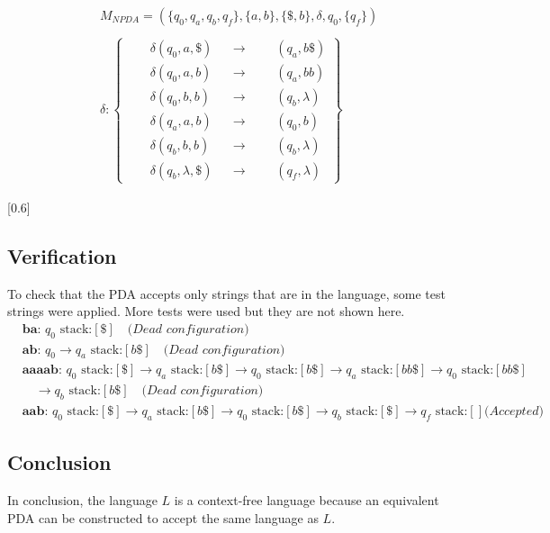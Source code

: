\documentclass{assignment-x}
\begin{document}
\begin{align*}
    &M_{NPDA} = (\{q_0,q_a,q_b, q_f\},\{a,b\},\{\$,b\},\delta,q_0,\{q_f\}) \\ \\
    &\delta:
    \left\{
    \begin{aligned}
        &\quad \delta(q_0,a,\$) &&\rightarrow &&&(q_a, b\$) \\
        &\quad \delta(q_0,a,b) &&\rightarrow &&&(q_a, bb) \\
        &\quad \delta(q_0,b,b) &&\rightarrow &&&(q_b, \lambda) \\
        &\quad \delta(q_a,a,b) &&\rightarrow &&&(q_0, b) \\
        &\quad \delta(q_b,b,b) &&\rightarrow &&&(q_b, \lambda) \\
        &\quad \delta(q_b,\lambda,\$) &&\rightarrow &&&(q_f, \lambda)
    \end{aligned}
    \right\}
\end{align*}

[0.6\linewidth]

\subsection{Verification}
To check that the PDA accepts only strings that are in the language, some test strings were applied. More tests were used but they are not shown here.
\begin{align*}
    &\textbf{ba: } q_0 \text{ stack:}[\$] \quad \textit{(Dead configuration)}\\
    &\textbf{ab: } q_0 \rightarrow q_a \text{ stack:}[b\$] \quad \textit{(Dead configuration)}\\
    &\textbf{aaaab: } q_0 \text{ stack:}[\$] \rightarrow q_a \text{ stack:}[b\$] \rightarrow q_0 \text{ stack:}[b\$] \rightarrow q_a \text{ stack:}[bb\$] \rightarrow q_0 \text{ stack:}[bb\$] \\
    &\quad \rightarrow q_b \text{ stack:}[b\$] \quad \textit{(Dead configuration)}\\
    &\textbf{aab: } q_0 \text{ stack:}[\$] \rightarrow q_a \text{ stack:}[b\$] \rightarrow q_0 \text{ stack:}[b\$] \rightarrow q_b \text{ stack:}[\$] \rightarrow q_f \text{ stack:}[] \textit{(Accepted)}
\end{align*}

\subsection{Conclusion}
In conclusion, the language $L$ is a context-free language because an equivalent PDA can be constructed to accept the same language as $L$.
\end{document}
